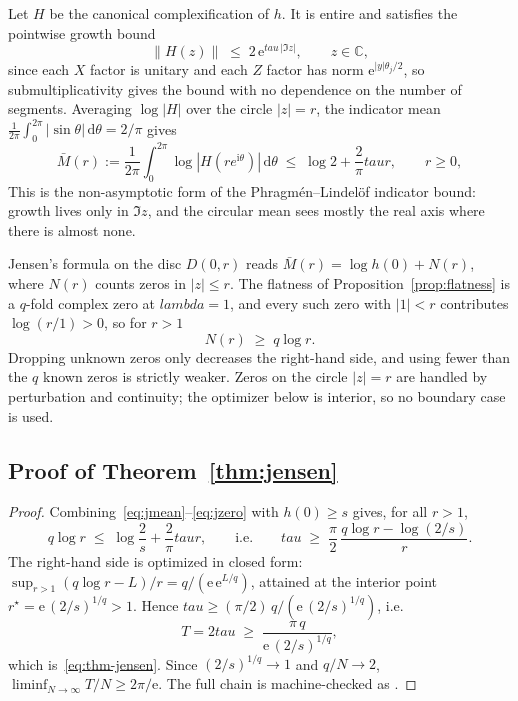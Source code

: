 \documentclass[%
  aps,
  pra,
  preprint,
  superscriptaddress,
  amsmath,amssymb,
  nofootinbib,
  floatfix,
]{revtex4-2}
\def\lambda{lambda}\def\tau{tau}\def\phi{phi}\def\alpha{alpha}%
\theoremstyle{definition}
\theoremstyle{remark}
\newcommand{\C}{\mathbb C}
\newcommand{\tauvar}{\tau}
\DeclareRobustCommand{\lean}[1]{\path{#1}}
\begin{document}
Let $H$ be the canonical complexification of $h$. It is entire and satisfies the pointwise
growth bound
\begin{equation}
\|H(z)\|\;\le\;2\,\mathrm{e}^{\tauvar\,|\Im z|},
\qquad z\in\C,
\label{eq:jgrow}
\end{equation}
since each $X$ factor is unitary and each
$Z$ factor has norm $\mathrm{e}^{|y|\theta_j/2}$, so submultiplicativity gives the bound with no
dependence on the number of segments. Averaging $\log|H|$ over the circle $|z|=r$,
the indicator mean $\frac1{2\pi}\int_0^{2\pi}|\sin\theta|\,\mathrm{d}\theta=2/\pi$ gives
\begin{equation}
\bar M(r)
:=\frac1{2\pi}\int_0^{2\pi}\log|H(re^{\mathrm{i}\theta})|\,\mathrm{d}\theta
\;\le\;\log2+\frac{2}{\pi}\tauvar r,
\qquad r\ge0,
\label{eq:jmean}
\end{equation}
This is the non-asymptotic form of the
Phragm\'en--Lindel\"of indicator bound: growth lives only in $\Im z$, and the circular mean
sees mostly the real axis where there is almost none.

Jensen's formula on the disc $D(0,r)$ reads
$\bar M(r)=\log h(0)+N(r)$, where $N(r)$ counts zeros in $|z|\le r$. The flatness of
Proposition~\ref{prop:flatness} is a $q$-fold complex zero at $\lambda=1$,
and every such zero with $|1|<r$ contributes $\log(r/1)>0$, so for $r>1$
\begin{equation}
N(r)\;\ge\;q\log r.
\label{eq:jzero}
\end{equation}
Dropping unknown zeros only decreases the right-hand side, and using fewer than the $q$
known zeros is strictly weaker. Zeros on the circle $|z|=r$ are handled by
perturbation and continuity; the optimizer below is interior, so no boundary case is used.

\subsection{Proof of Theorem~\ref{thm:jensen}}

\begin{proof}
Combining~\eqref{eq:jmean}--\eqref{eq:jzero} with $h(0)\ge s$ gives, for all $r>1$,
\begin{equation}
q\log r\;\le\;\log\frac{2}{s}+\frac{2}{\pi}\tauvar r,
\qquad\text{i.e.}\qquad
\tauvar\;\ge\;\frac{\pi}{2}\,\frac{q\log r-\log(2/s)}{r}.
\label{eq:jcombine}
\end{equation}
The right-hand side is optimized in closed form:
$\sup_{r>1}(q\log r-L)/r=q/(\mathrm{e}\,\mathrm{e}^{L/q})$, attained at the interior point
$r^\star=\mathrm{e}\,(2/s)^{1/q}>1$. Hence
$\tauvar\ge(\pi/2)\,q/(\mathrm{e}\,(2/s)^{1/q})$, i.e.
\begin{equation}
T=2\tauvar\;\ge\;\frac{\pi\,q}{\mathrm{e}\,(2/s)^{1/q}},
\end{equation}
which is~\eqref{eq:thm-jensen}. Since $(2/s)^{1/q}\to1$ and $q/N\to2$,
$\liminf_{N\to\infty}T/N\ge2\pi/\mathrm{e}$. The full chain is machine-checked as
\lean{jensen_rung_final}.
\end{proof}
\end{document}
